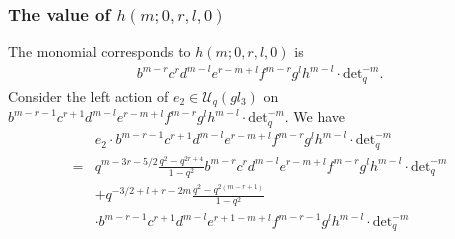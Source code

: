 \documentclass[table,a4paper,reqno]{amsart}
\numberwithin{equation}{section}
\theoremstyle{definition}
\begin{document}
\subsubsection{The value of $h(m;0,r,l,0)$}
The monomial corresponds to $h(m;0,r,l,0)$ is
\begin{align}
     b^{m-r}c^{r}d^{m-l}e^{r-m+l}f^{m-r}g^{l}h^{m-l}\cdot\text{det}_q^{-m}.
\end{align}
Consider the left action of $e_2\in\mathcal{U}_q(gl_3)$ on $b^{m-r-1}c^{r+1}d^{m-l}e^{r-m+l}f^{m-r}g^{l}h^{m-l}\cdot\text{det}_q^{-m}$. We have
\begin{equation}\label{eq:4.44}
    \begin{split}
        &e_2\cdot b^{m-r-1}c^{r+1}d^{m-l}e^{r-m+l}f^{m-r}g^{l}h^{m-l}\cdot\text{det}_q^{-m}\\
        =&q^{m-3r-5/2}\frac{q^2-q^{2r+4}}{1-q^2}b^{m-r}c^{r}d^{m-l}e^{r-m+l}f^{m-r}g^{l}h^{m-l}\cdot\text{det}_q^{-m}\\
        &+q^{-3/2+l+r-2m}\frac{q^2-q^{2(m-r+1)}}{1-q^2}\\
        &\cdot b^{m-r-1}c^{r+1}d^{m-l}e^{r+1-m+l}f^{m-r-1}g^{l}h^{m-l}\cdot\text{det}_q^{-m}\\
    \end{split}
\end{equation}
\end{document}
